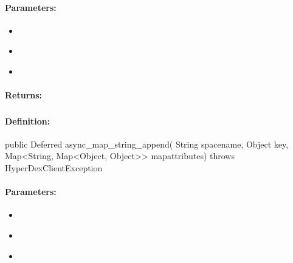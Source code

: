 \paragraph{Parameters:}
\begin{itemize}[noitemsep]
\item {}\\

\item {}\\

\item {}\\

\end{itemize}

\paragraph{Returns:}


\pagebreak
\subsubsection{}
\label{api:java:async_map_string_append}


\paragraph{Definition:}
\begin{javacode}
public Deferred async_map_string_append(
        String spacename,
        Object key,
        Map<String, Map<Object, Object>> mapattributes) throws HyperDexClientException
\end{javacode}

\paragraph{Parameters:}
\begin{itemize}[noitemsep]
\item {}\\

\item {}\\

\item {}\\

\end{itemize}

